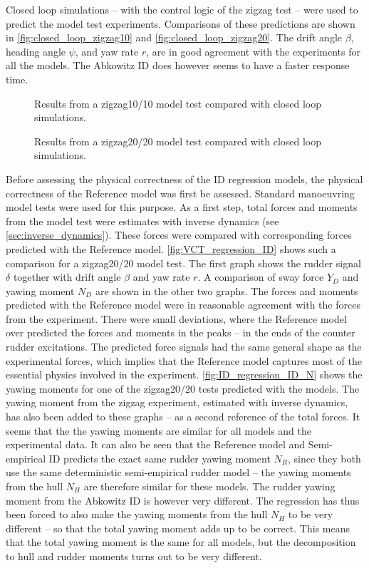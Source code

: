 Closed loop simulations -- with the control logic of the zigzag test -- were used to predict the model test experiments. Comparisons of these predictions are shown in \autoref{fig:closed_loop_zigzag10} and \autoref{fig:closed_loop_zigzag20}. The drift angle $\beta$, heading angle $\psi$, and yaw rate $r$, are in good agreement with the experiments for all the models. The Abkowitz ID does however seems to have a faster response time.
\begin{figure}[h]
    \centering
    
    \caption{Results from a zigzag10/10 model test compared with closed loop simulations.}
    \label{fig:closed_loop_zigzag10}
\end{figure}
\begin{figure}[h]
    \centering
    
    \caption{Results from a zigzag20/20 model test compared with closed loop simulations.}
    \label{fig:closed_loop_zigzag20}
\end{figure}
Before assessing the physical correctness of the ID regression models, the physical correctness of the Reference model was first be assessed. Standard manoeuvring model tests were used for this purpose. As a first step, total forces and moments from the model test were estimates with inverse dynamics (see \autoref{sec:inverse_dynamics}). These forces were compared with corresponding forces predicted with the Reference model. 
\autoref{fig:VCT_regression_ID} shows such a comparison for a zigzag20/20 model test. The first graph shows the rudder signal $\delta$ together with drift angle $\beta$ and yaw rate $r$. A comparison of sway force $Y_D$ and yawing moment $N_D$ are shown in the other two graphs. The forces and moments predicted with the Reference model were in reasonable agreement with the forces from the experiment. There were small deviations, where the Reference model over predicted the forces and moments in the peaks -- in the ends of the counter rudder excitations. 
The predicted force signals had the same general shape as the experimental forces, which implies that the Reference model captures most of the essential physics involved in the experiment.
\autoref{fig:ID_regression_ID_N} shows the yawing moments for one of the zigzag20/20 tests predicted with the models. The yawing moment from the zigzag experiment, estimated with inverse dynamics, has also been added to these graphs -- as a second reference of the total forces. It seems that the the yawing moments are similar for all models and the experimental data. It can also be seen that the Reference model and Semi-empirical ID predicts the exact same rudder yawing moment $N_R$, since they both use the same deterministic semi-empirical rudder model -- the yawing moments from the hull $N_H$ are therefore similar for these models. The rudder yawing moment from the Abkowitz ID is however very different. The regression has thus been forced to also make the yawing moments from the hull $N_H$ to be very different -- so that the total yawing moment adds up to be correct. This means that the total yawing moment is the same for all models, but the decomposition to hull and rudder moments turns out to be very different.
